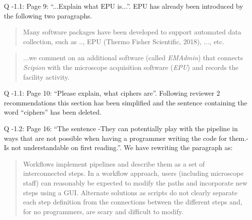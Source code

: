 \documentclass[a4paper,12pt]{article}
\def\scipion{\textit{Scipion}\xspace}
\def\emadmin{\textit{EMAdmin}\xspace}
\def\epu{\textit{EPU}\xspace}
\begin{document}
\begin{reviewer}
Q \the\numexpr\value{pointcounter}-1\relax.1: Page 9: ``...Explain what EPU is...''. EPU has already been introduced by the following two paragraphs.

\begin{quote}
 Many software packages have been developed to support automated data collection, such as 
 .., EPU (Thermo Fisher Scientific, 2018), ..., etc.
\end{quote}

\begin{quote}
...we comment on an additional software (called  \emadmin) that connects \scipion with the microscope acquisition software (\epu) and records the facility activity.
\end{quote}

Q \the\numexpr\value{pointcounter}-1\relax.1: Page 10: ``Please explain, what ciphers are''. Following reviewer 2 recommendations this section has been simplified and the sentence containing the word ``ciphers'' has been deleted. 

Q \the\numexpr\value{pointcounter}-1\relax.2: Page 16: ``The sentence -They can potentially play with the pipeline in ways that are not possible when having a programmer writing the code for them.- Is not understandable on first reading.''. We have rewriting the paragraph as:


\begin{quote}
 Workflows implement pipelines and describe them as a set of interconnected steps. In a workflow approach, users (including microscope staff) can reasonably be expected to modify the paths and incorporate new steps using a GUI. Alternate solutions as scripts do not clearly separate each step definition from the connections between the different steps and, for no programmers, are scary and difficult to modify. 
\end{quote}

\end{reviewer}
\end{document}
